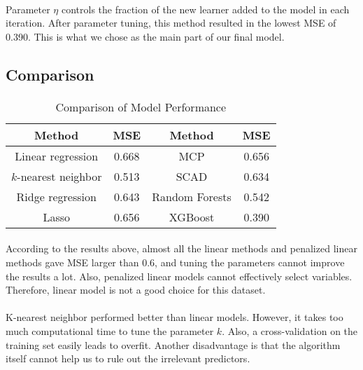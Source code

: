\documentclass[paper=a4, fontsize=11pt]{scrartcl} %
\numberwithin{equation}{section} %
\numberwithin{figure}{section} %
\numberwithin{table}{section} %
\begin{document}
\paragraph{}
Parameter \(\eta\) controls the fraction of the new learner added to the model in each iteration. After parameter tuning, this method resulted in the lowest MSE of 0.390. This is what we chose as the main part of our final model.

\subsection{Comparison}
\paragraph{}
\begin{table}[ht]
\caption{Comparison of Model Performance} %
\centering %
\small
\begin{tabular}{c c || c c} %

\hline %
Method & MSE & Method & MSE\\ [.5ex]
\hline
Linear regression & 0.668 & MCP & 0.656\\
\hline
\(k\)-nearest neighbor & 0.513 & SCAD & 0.634\\
\hline
Ridge regression & 0.643 & Random Forests & 0.542\\
\hline
Lasso & 0.656 & XGBoost & 0.390 \\ [1ex]
\hline %
\end{tabular}
\end{table}

\paragraph{}
According to the results above, almost all the linear methods and penalized linear methods gave MSE larger than 0.6, and tuning the parameters cannot improve the results a lot. Also, penalized linear models cannot effectively select variables. Therefore, linear model is not a good choice for this dataset.
\paragraph{}
K-nearest neighbor performed better than linear models. However, it takes too much computational time to tune the parameter \(k\). Also, a cross-validation on the training set easily leads to overfit. Another disadvantage is that the algorithm itself cannot help us to rule out the irrelevant predictors.
\end{document}
